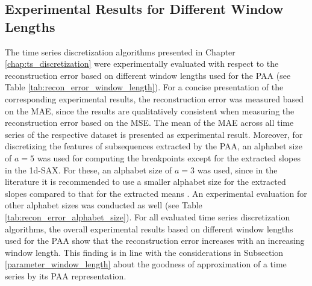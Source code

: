 \subsection*{Experimental Results for Different Window Lengths} \label{findings_different_window_length}
The time series discretization algorithms presented in Chapter \ref{chap:ts_discretization} were experimentally evaluated with respect to the reconstruction error based on different window lengths used for the \ac{PAA} (see Table \ref{tab:recon_error_window_length}). For a concise presentation of the corresponding experimental results, the reconstruction error was measured based on the \ac{MAE}, since the results are qualitatively consistent when measuring the reconstruction error based on the \ac{MSE}. The mean of the MAE across all time series of the respective dataset is presented as experimental result. Moreover, for discretizing the features of subsequences extracted by the \ac{PAA}, an alphabet size of $a = 5$ was used for computing the breakpoints except for the extracted slopes in the \ac{1d-SAX}. For these, an alphabet size of $a = 3$ was used, since in the literature it is recommended to use a smaller alphabet size for the extracted slopes compared to that for the extracted means \cite{1d-SAX}. An experimental evaluation for other alphabet sizes was conducted as well (see Table \ref{tab:recon_error_alphabet_size}). \newline
For all evaluated time series discretization algorithms, the overall experimental results based on different window lengths used for the \ac{PAA} show that the reconstruction error increases with an increasing window length. This finding is in line with the considerations in Subsection \ref{parameter_window_length} about the goodness of approximation of a time series by its \ac{PAA} representation. \newline
